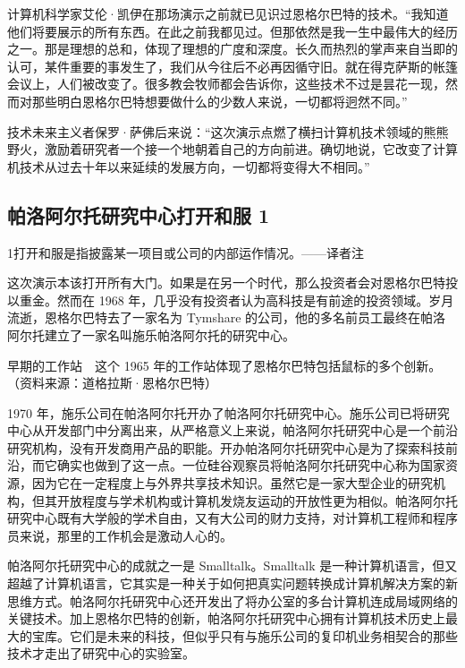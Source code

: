 \documentclass[12pt,UTF8]{ctexbook}
\begin{document}
计算机科学家艾伦·凯伊在那场演示之前就已见识过恩格尔巴特的技术。“我知道他们将要展示的所有东西。在此之前我都见过。但那依然是我一生中最伟大的经历之一。那是理想的总和，体现了理想的广度和深度。长久而热烈的掌声来自当即的认可，某件重要的事发生了，我们从今往后不必再因循守旧。就在得克萨斯的帐篷会议上，人们被改变了。很多教会牧师都会告诉你，这些技术不过是昙花一现，然而对那些明白恩格尔巴特想要做什么的少数人来说，一切都将迥然不同。”

技术未来主义者保罗·萨佛后来说：“这次演示点燃了横扫计算机技术领域的熊熊野火，激励着研究者一个接一个地朝着自己的方向前进。确切地说，它改变了计算机技术从过去十年以来延续的发展方向，一切都将变得大不相同。”





\subsection{帕洛阿尔托研究中心打开和服 1}


1打开和服是指披露某一项目或公司的内部运作情况。——译者注

这次演示本该打开所有大门。如果是在另一个时代，那么投资者会对恩格尔巴特投以重金。然而在 1968 年，几乎没有投资者认为高科技是有前途的投资领域。岁月流逝，恩格尔巴特去了一家名为 Tymshare 的公司，他的多名前员工最终在帕洛阿尔托建立了一家名叫施乐帕洛阿尔托的研究中心。



早期的工作站　这个 1965 年的工作站体现了恩格尔巴特包括鼠标的多个创新。（资料来源：道格拉斯·恩格尔巴特）

1970 年，施乐公司在帕洛阿尔托开办了帕洛阿尔托研究中心。施乐公司已将研究中心从开发部门中分离出来，从严格意义上来说，帕洛阿尔托研究中心是一个前沿研究机构，没有开发商用产品的职能。开办帕洛阿尔托研究中心是为了探索科技前沿，而它确实也做到了这一点。一位硅谷观察员将帕洛阿尔托研究中心称为国家资源，因为它在一定程度上与外界共享技术知识。虽然它是一家大型企业的研究机构，但其开放程度与学术机构或计算机发烧友运动的开放性更为相似。帕洛阿尔托研究中心既有大学般的学术自由，又有大公司的财力支持，对计算机工程师和程序员来说，那里的工作机会是激动人心的。

帕洛阿尔托研究中心的成就之一是 Smalltalk。Smalltalk 是一种计算机语言，但又超越了计算机语言，它其实是一种关于如何把真实问题转换成计算机解决方案的新思维方式。帕洛阿尔托研究中心还开发出了将办公室的多台计算机连成局域网络的关键技术。加上恩格尔巴特的创新，帕洛阿尔托研究中心拥有计算机技术历史上最大的宝库。它们是未来的科技，但似乎只有与施乐公司的复印机业务相契合的那些技术才走出了研究中心的实验室。
\end{document}
